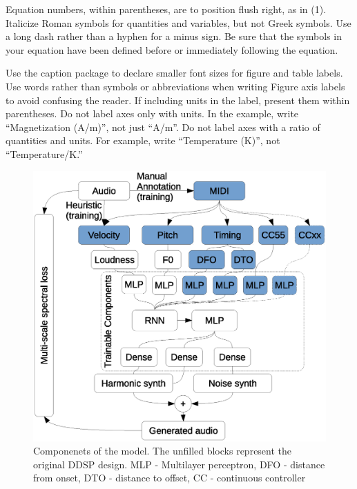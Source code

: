\documentclass{article}
\begin{document}
\begin{sloppy}
Equation numbers, within parentheses, are to position flush right, as in (1). Italicize Roman symbols for quantities and variables, but not Greek symbols. Use a long dash rather than a hyphen for a minus sign. Be sure that the symbols in your equation have been defined before or immediately following the equation.

Use the caption package to declare smaller font sizes for figure and table labels. Use words rather than symbols or abbreviations when writing Figure axis labels to avoid confusing the reader. If including units in the label, present them within parentheses. Do not label axes only with units. In the example, write “Magnetization (A/m)”, not just “A/m”. Do not label axes with a ratio of quantities and units. For example, write “Temperature (K)”, not “Temperature/K.”


\begin{figure}[t]
  \centering
  \centerline{\includegraphics[scale=0.4]{components}}
  \caption{Componenets of the model. The unfilled blocks represent the original DDSP design. 
MLP - Multilayer perceptron, 
DFO - distance from onset, 
DTO - distance to offset,
CC - continuous controller
}
  \label{fig:components}
\end{figure}


\end{sloppy}
\end{document}
